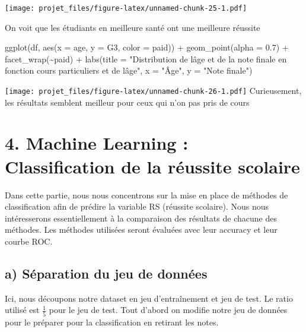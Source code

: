 \documentclass[
]{article}
\newenvironment{Shaded}{\begin{snugshade}}{\end{snugshade}}
\newcommand{\AttributeTok}[1]{\textcolor[rgb]{0.77,0.63,0.00}{#1}}
\newcommand{\FloatTok}[1]{\textcolor[rgb]{0.00,0.00,0.81}{#1}}
\newcommand{\FunctionTok}[1]{\textcolor[rgb]{0.00,0.00,0.00}{#1}}
\newcommand{\NormalTok}[1]{#1}
\newcommand{\SpecialCharTok}[1]{\textcolor[rgb]{0.00,0.00,0.00}{#1}}
\newcommand{\StringTok}[1]{\textcolor[rgb]{0.31,0.60,0.02}{#1}}
\begin{document}
\texttt{[image: projet\_files/figure-latex/unnamed-chunk-25-1.pdf]}

On voit que les étudiants en meilleure santé ont une meilleure réussite

\begin{Shaded}
\begin{Highlighting}[]
\FunctionTok{ggplot}\NormalTok{(df, }\FunctionTok{aes}\NormalTok{(}\AttributeTok{x =}\NormalTok{ age, }\AttributeTok{y =}\NormalTok{ G3, }\AttributeTok{color =}\NormalTok{ paid)) }\SpecialCharTok{+}
  \FunctionTok{geom\_point}\NormalTok{(}\AttributeTok{alpha =} \FloatTok{0.7}\NormalTok{) }\SpecialCharTok{+}
  \FunctionTok{facet\_wrap}\NormalTok{(}\SpecialCharTok{\textasciitilde{}}\NormalTok{paid) }\SpecialCharTok{+}
  \FunctionTok{labs}\NormalTok{(}\AttributeTok{title =} \StringTok{"Distribution de l\textquotesingle{}âge et de la note finale en fonction cours particuliers et de l\textquotesingle{}âge"}\NormalTok{,}
       \AttributeTok{x =} \StringTok{"Âge"}\NormalTok{, }\AttributeTok{y =} \StringTok{"Note finale"}\NormalTok{)}
\end{Highlighting}
\end{Shaded}

\texttt{[image: projet\_files/figure-latex/unnamed-chunk-26-1.pdf]}
Curieusement, les résultats semblent meilleur pour ceux qui n'on pas
pris de cours

\hypertarget{machine-learning-classification-de-la-ruxe9ussite-scolaire}{%
\section{4. Machine Learning : Classification de la réussite
scolaire}\label{machine-learning-classification-de-la-ruxe9ussite-scolaire}}

Dans cette partie, nous nous concentrons sur la mise en place de
méthodes de classification afin de prédire la variable RS (réussite
scolaire). Nous nous intéresserons essentiellement à la comparaison des
résultats de chacune des méthodes. Les méthodes utilisées seront
évaluées avec leur accuracy et leur courbe ROC.

\hypertarget{a-suxe9paration-du-jeu-de-donnuxe9es}{%
\subsection{a) Séparation du jeu de
données}\label{a-suxe9paration-du-jeu-de-donnuxe9es}}

Ici, nous découpons notre dataset en jeu d'entraînement et jeu de test.
Le ratio utilisé est \(\frac{1}{5}\) pour le jeu de test. Tout d'abord
on modifie notre jeu de données pour le préparer pour la classification
en retirant les notes.
\end{document}
